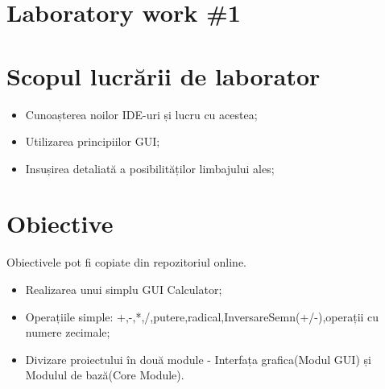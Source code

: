 \section*{Laboratory work \#1}

\section{Scopul lucrării de laborator}
\begin{itemize}
\item  Cunoașterea noilor IDE-uri și lucru cu acestea;
\item  Utilizarea principiilor GUI;
\item  Insușirea detaliată a posibilităților limbajului ales;
\end{itemize}
\section{Obiective}

Obiectivele pot fi copiate din repozitoriul online.

\begin{itemize}
\item Realizarea unui simplu GUI Calculator;
\item Operațiile simple: +,-,*,/,putere,radical,InversareSemn(+/-),operații cu numere zecimale;
\item Divizare proiectului în două module - Interfața grafica(Modul GUI) și Modulul de bază(Core Module).
\end{itemize}

\clearpage